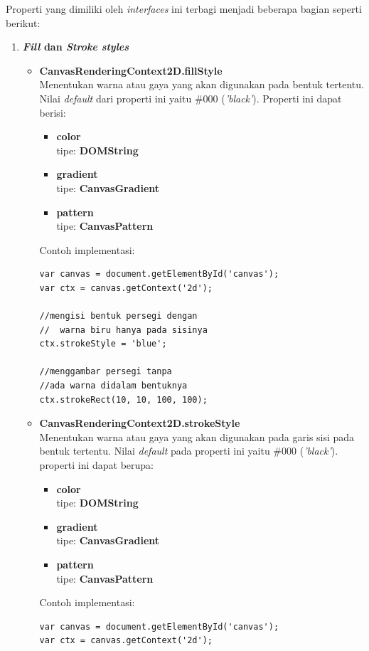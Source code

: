 \documentclass[a4paper,twoside]{article}
\begin{document}
\begin{enumerate}
\begin{enumerate}
			Properti yang dimiliki oleh \textit{interfaces} ini terbagi menjadi beberapa bagian seperti berikut:
			\begin{enumerate}
				\item \textbf{\textit{Fill} dan \textit{Stroke styles}}
				\begin{itemize}
					\item \textbf{CanvasRenderingContext2D.fillStyle} \\ Menentukan warna atau gaya yang akan digunakan pada bentuk tertentu. Nilai \textit{default} dari properti ini yaitu \#000 (\textit{'black'}). Properti ini dapat berisi:
					\begin{itemize}
						\item \textbf{color} \\tipe: \textbf{DOMString} 
						\item \textbf{gradient} \\tipe: \textbf{CanvasGradient}
						\item \textbf{pattern} \\tipe: \textbf{CanvasPattern}
					\end{itemize}
					Contoh implementasi:
\begin{lstlisting}
var canvas = document.getElementById('canvas');
var ctx = canvas.getContext('2d');
					
//mengisi bentuk persegi dengan
//  warna biru hanya pada sisinya
ctx.strokeStyle = 'blue'; 
					
//menggambar persegi tanpa 
//ada warna didalam bentuknya
ctx.strokeRect(10, 10, 100, 100);
\end{lstlisting}
					
					\item \textbf{CanvasRenderingContext2D.strokeStyle} \\ Menentukan warna atau gaya yang akan digunakan pada garis sisi pada bentuk tertentu. Nilai \textit{default} pada properti ini yaitu \#000 (\textit{'black'}). properti ini dapat berupa:
					\begin{itemize}
						\item \textbf{color} \\tipe: \textbf{DOMString} 
						\item \textbf{gradient} \\tipe: \textbf{CanvasGradient}
						\item \textbf{pattern} \\tipe: \textbf{CanvasPattern}
					\end{itemize}
					Contoh implementasi:
\begin{lstlisting}
var canvas = document.getElementById('canvas');
var ctx = canvas.getContext('2d');
					

\end{lstlisting}
\end{itemize}
\end{enumerate}
\end{enumerate}
\end{enumerate}
\end{document}
